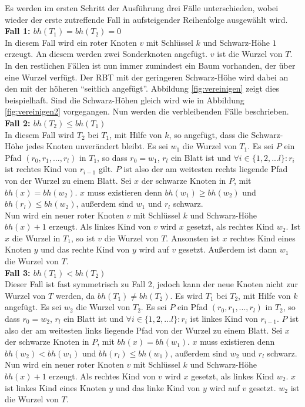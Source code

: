 \documentclass[a4paper,12pt]{article}
\begin{document}
 Es werden im ersten Schritt der Ausführung drei Fälle unterschieden, wobei wieder der erste zutreffende Fall in aufsteigender Reihenfolge ausgewählt wird. \\
\noindent\textbf{Fall 1: $bh(T_1) = bh(T_2) = 0$ }\\   
In diesem Fall wird ein roter Knoten $v$ mit Schlüssel $k$ und Schwarz-Höhe $1$ erzeugt. An diesem werden zwei Sonderknoten angefügt. $v$ ist die Wurzel von $T$. \\
In den restlichen Fällen ist nun immer zumindest ein Baum vorhanden, der über eine Wurzel verfügt. Der RBT mit der geringeren Schwarz-Höhe wird dabei an den mit der höheren \enquote{seitlich angefügt}. Abbildung \ref{fig:vereinigen} zeigt dies beispielhaft. Sind die Schwarz-Höhen gleich wird wie in Abbildung \ref{fig:vereinigen2} vorgegangen. Nun werden die verbleibenden Fälle beschrieben.\\
\noindent\textbf{Fall 2: $bh(T_2) \leq bh(T_1)$ }\\
In diesem Fall wird $T_2$ bei $T_1$, mit Hilfe von $k$, so angefügt, dass die Schwarz-Höhe jedes Knoten unverändert bleibt. Es sei $w_1$ die Wurzel von $T_1$. Es sei $P$ ein Pfad $(r_0,r_1,...,r_l)$ in $T_1$, so dass $r_0 = w_1$, $r_l$ ein Blatt ist und $\forall i \in \{1,2,...l\} \colon r_i$  ist rechtes Kind von  $r_{i-1}$ gilt. $P$ ist also der am weitesten rechts liegende Pfad von der Wurzel zu einem Blatt. Sei $x$ der schwarze Knoten in $P$, mit $\mathit{bh}(x) = \mathit{bh}(w_2)$. $x$ muss existieren denn $\mathit{bh}(w_1) \geq \mathit{bh}(w_2)$ und $\mathit{bh}(r_l) \leq  \mathit{bh}(w_2)$, außerdem sind $w_1$ und $r_l$ schwarz.\\
 Nun wird ein neuer roter Knoten $v$ mit Schlüssel $k$ und Schwarz-Höhe $\mathit{bh}(x) + 1$ erzeugt. Als linkes Kind von $v$  wird $x$ gesetzt, als rechtes Kind $w_2$. Ist $x$ die Wurzel in $T_1$, so ist $v$ die Wurzel von $T$. Ansonsten ist $x$ rechtes Kind eines Knoten $y$ und das rechte Kind von $y$ wird auf $v$ gesetzt. Außerdem ist dann $w_1$ die Wurzel von $T$.     \\  
\noindent\textbf{Fall 3: $bh(T_1) < bh(T_2)$ }\\ 
Dieser Fall ist fast symmetrisch zu Fall 2, jedoch kann der neue Knoten nicht zur Wurzel von $T$ werden, da $bh(T_1) \neq bh(T_2)$.
Es wird $T_1$ bei $T_2$, mit Hilfe von $k$ angefügt. Es sei $w_2$ die Wurzel von $T_2$. Es sei $P$ ein Pfad $(r_0,r_1,...,r_l)$ in $T_2$, so dass $r_0 = w_2$, $r_l$ ein Blatt ist und $\forall i \in \{1,2,...l\} \colon r_i$  ist linkes Kind von  $r_{i-1}$. $P$ ist also der am weitesten links liegende Pfad von der Wurzel zu einem Blatt. Sei $x$ der schwarze Knoten in $P$, mit $\mathit{bh}(x) = \mathit{bh}(w_1)$. $x$ muss existieren denn $\mathit{bh}(w_2) < \mathit{bh}(w_1)$ und $\mathit{bh}(r_l) \leq  \mathit{bh}(w_1)$, außerdem sind $w_2$ und $r_l$ schwarz. Nun wird ein neuer roter Knoten $v$ mit Schlüssel $k$ und Schwarz-Höhe $\mathit{bh}(x) + 1$ erzeugt. Als rechtes Kind von $v$  wird $x$ gesetzt, als linkes Kind $w_2$. $x$ ist linkes Kind eines Knoten $y$ und das linke Kind von $y$ wird auf $v$ gesetzt. $w_2$ ist die Wurzel von $T$. \\   
\end{document}
